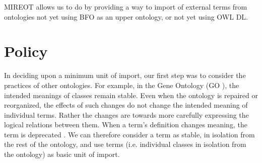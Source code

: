 \documentclass[a4paper,10pt,twocolumn]{article}
\begin{document}
\ac{MIREOT} allows us to do by providing a way to import of external terms from ontologies not yet using BFO as an upper ontology, or not yet using OWL DL.


\section*{Policy}



In deciding upon a minimum unit of import, our first step was to consider the practices of other ontologies.
For example, in the Gene Ontology (GO \cite{RefWorks:79}), the intended meanings of classes remain stable.
Even when the ontology is repaired or reorganized, the effects of such changes do not change the intended meaning of individual terms.
Rather the changes are towards more carefully expressing the logical relations between them.
When a term's definition changes meaning, the term is deprecated \cite{RefWorks:1560}.
We can therefore consider a term as stable, in isolation from the rest of the ontology, and use terms (i.e. individual classes in isolation from the ontology) as basic unit of import.



\end{document}
